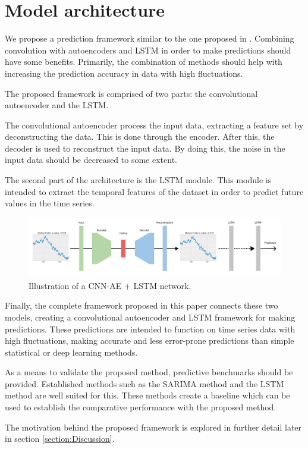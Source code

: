 \section{Model architecture}
\label{section:Architecture:Model}

We propose a prediction framework similar to the one proposed in \cite{Zhao2019}.
Combining convolution with autoencoders and LSTM in order to make predictions should have some benefits.
Primarily, the combination of methods should help with increasing the prediction accuracy in data with high fluctuations.

The proposed framework is comprised of two parts: the convolutional autoencoder and the LSTM.

The convolutional autoencoder process the input data, extracting a feature set by deconstructing the data.
This is done through the encoder. After this, the decoder is used to reconstruct the input data.
By doing this, the noise in the input data should be decreased to some extent.

The second part of the architecture is the LSTM module.
This module is intended to extract the temporal features of the dataset
in order to predict future values in the time series.

\begin{figure}[h!]
    \centering
    \includegraphics[width=\textwidth]{./sections/Architecture/figures/CNN-AE + LSTM.png}
    \hfill
    \caption{Illustration of a CNN-AE + LSTM network.}
    \label{fig:stacked_autoencoder_arch}
\end{figure}

Finally, the complete framework proposed in this paper connects these two models,
creating a convolutional autoencoder and LSTM framework for making predictions.
These predictions are intended to function on time series data with high fluctuations,
making accurate and less error-prone predictions than simple statistical or deep learning methods.


As a means to validate the proposed method, predictive benchmarks should be provided.
Established methods such as the SARIMA method and the LSTM method are well suited for this.
These methods create a baseline which can be used to establish the comparative performance with the proposed method.

The motivation behind the proposed framework is explored in further detail later in section \ref{section:Discussion}.

